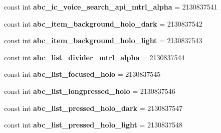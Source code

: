 \begin{DoxyCompactItemize}
const int {\bfseries abc\+\_\+ic\+\_\+voice\+\_\+search\+\_\+api\+\_\+mtrl\+\_\+alpha} = 2130837541
\item 
\mbox{\label{class_pinned_app_1_1_droid_1_1_resource_1_1_drawable_a1fbd4f70d9e46bdc226a19d692d7a852}} 
const int {\bfseries abc\+\_\+item\+\_\+background\+\_\+holo\+\_\+dark} = 2130837542
\item 
\mbox{\label{class_pinned_app_1_1_droid_1_1_resource_1_1_drawable_ab77bbb3382852033f5df6df4f00ef0bc}} 
const int {\bfseries abc\+\_\+item\+\_\+background\+\_\+holo\+\_\+light} = 2130837543
\item 
\mbox{\label{class_pinned_app_1_1_droid_1_1_resource_1_1_drawable_a38de29184e138f351f11ef78ddca2e93}} 
const int {\bfseries abc\+\_\+list\+\_\+divider\+\_\+mtrl\+\_\+alpha} = 2130837544
\item 
\mbox{\label{class_pinned_app_1_1_droid_1_1_resource_1_1_drawable_a9c82f429437e70ee208e5fa83d1c3e31}} 
const int {\bfseries abc\+\_\+list\+\_\+focused\+\_\+holo} = 2130837545
\item 
\mbox{\label{class_pinned_app_1_1_droid_1_1_resource_1_1_drawable_acad0aa772ad6c4f53911aa26932b2f2c}} 
const int {\bfseries abc\+\_\+list\+\_\+longpressed\+\_\+holo} = 2130837546
\item 
\mbox{\label{class_pinned_app_1_1_droid_1_1_resource_1_1_drawable_a734d728836cc7a8ebdd74c7975581ab7}} 
const int {\bfseries abc\+\_\+list\+\_\+pressed\+\_\+holo\+\_\+dark} = 2130837547
\item 
\mbox{\label{class_pinned_app_1_1_droid_1_1_resource_1_1_drawable_a86f82fef91d46ee3fea69f23dcc8412d}} 
const int {\bfseries abc\+\_\+list\+\_\+pressed\+\_\+holo\+\_\+light} = 2130837548
\item 
\mbox{\label{class_pinned_app_1_1_droid_1_1_resource_1_1_drawable_a81807e65c13d07d802a76f4cb10d6e38}} 

\end{DoxyCompactItemize}
